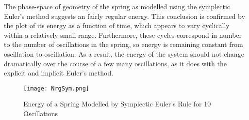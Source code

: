 \documentclass[10pt]{article}
\newenvironment{problem}[2][Problem]{\begin{trivlist}
\item[\hskip \labelsep {\bfseries #1}\hskip \labelsep {\bfseries #2.}]}{\end{trivlist}}
\begin{document}
\newpage
\begin{problem} {8}
The phase-space of geometry of the spring as modelled using the symplectic Euler's method suggests an fairly regular energy. This conclusion is confirmed by the plot of its energy as a function of time, which appears to vary cyclically within a relatively small range. Furthermore, these cycles correspond in number to the number of oscillations in the spring, so energy is remaining constant from oscillation to oscillation. As a result, the energy of the system should not change dramatically over the course of a few many oscillations, as it does with the explicit and implicit Euler's method.
\begin{figure} [h]
\centering
    \texttt{[image: NrgSym.png]}
\centering
    \caption{Energy of a Spring Modelled by Symplectic Euler's Rule for 10 Oscillations}
\end{figure}
\end{problem}
\end{document}
